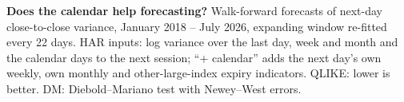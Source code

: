 \begin{table}[t]
\centering
\caption{\textbf{Does the calendar help forecasting?} Walk-forward forecasts of next-day close-to-close variance, January 2018 -- July 2026, expanding window re-fitted every 22 days. HAR inputs: log variance over the last day, week and month and the calendar days to the next session; ``+ calendar'' adds the next day's own weekly, own monthly and other-large-index expiry indicators. QLIKE: lower is better. DM: Diebold--Mariano test with Newey--West errors.}
\label{tab:forecast}
\small
{}
\end{table}

